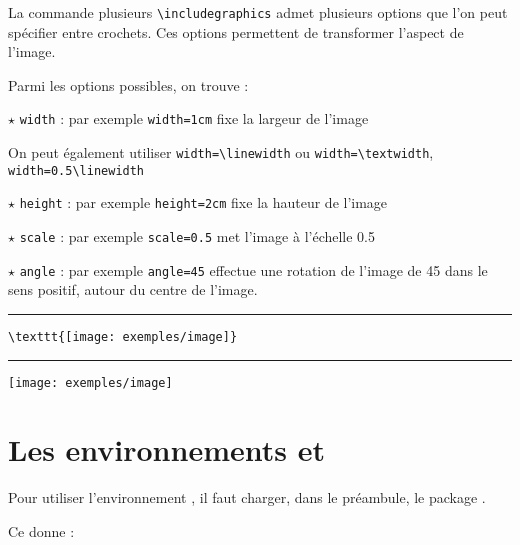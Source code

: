 La commande plusieurs \verb!\includegraphics! admet plusieurs options que l'on peut spécifier entre crochets. Ces options permettent de transformer l'aspect de l'image.

Parmi les options possibles, on trouve :

$\star$ \verb!width! : par exemple \verb!width=1cm! fixe la largeur de l'image

On peut également utiliser \verb!width=\linewidth! ou \verb!width=\textwidth!, \verb!width=0.5\linewidth!

$\star$ \verb!height! : par exemple \verb!height=2cm! fixe la hauteur de l'image

$\star$ \verb!scale! : par exemple \verb!scale=0.5! met l'image à l'échelle 0.5

$\star$ \verb!angle! : par exemple \verb!angle=45! effectue une rotation de l'image de 45\degres{} dans le sens positif, autour du centre de l'image.

\bigskip

\begin{minipage}{0.8\linewidth}
\color{blue}\rule{9cm}{1pt}\color{black}
\vspace*{-12pt}

\begin{small}
\begin{verbatim}
\texttt{[image: exemples/image]}
\end{verbatim}
\end{small}

\vspace*{-12pt}
\color{blue}\rule{9cm}{1pt}\color{black}
\end{minipage}
\hfill
\begin{minipage}{0.2\linewidth}
\texttt{[image: exemples/image]}
\end{minipage}

\section{Les environnements  et }

Pour utiliser l'environnement , il faut charger, dans le préambule, le package .


Ce  donne :




